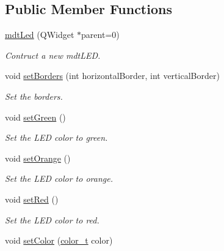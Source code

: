 \subsection*{Public Member Functions}
\begin{DoxyCompactItemize}
\item 
\hyperlink{classmdt_led_a64d5de3a8c2e4937d9ca9328b5ae4f9c}{mdtLed} (QWidget $\ast$parent=0)
\begin{DoxyCompactList}\small\item\em Contruct a new mdtLED. \end{DoxyCompactList}\item 
void \hyperlink{classmdt_led_a1271e1dfe07e8ff459d7f20e55ab3bc4}{setBorders} (int horizontalBorder, int verticalBorder)
\begin{DoxyCompactList}\small\item\em Set the borders. \end{DoxyCompactList}\item 
void \hyperlink{classmdt_led_a5f3b4975c423ac35442ec2b9c546b0e4}{setGreen} ()
\begin{DoxyCompactList}\small\item\em Set the LED color to green. \end{DoxyCompactList}\item 
void \hyperlink{classmdt_led_a5cdd40d1e3baefab72d9cda866353797}{setOrange} ()
\begin{DoxyCompactList}\small\item\em Set the LED color to orange. \end{DoxyCompactList}\item 
void \hyperlink{classmdt_led_a28e208fb105c99b21d81d4c82ed50a98}{setRed} ()
\begin{DoxyCompactList}\small\item\em Set the LED color to red. \end{DoxyCompactList}\item 
\hypertarget{classmdt_led_a16e89edb08321c7abec736b2ebf28986}{
void \hyperlink{classmdt_led_a16e89edb08321c7abec736b2ebf28986}{setColor} (\hyperlink{classmdt_led_a2d57d9ef04d2105d2fad93b57fc7cfef}{color\_\-t} color)}
\label{classmdt_led_a16e89edb08321c7abec736b2ebf28986}


\end{DoxyCompactItemize}
